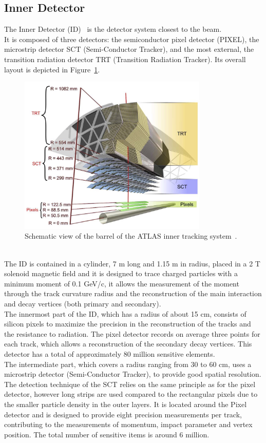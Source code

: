 \subsection{Inner Detector}
\label{sec:ID}
The Inner Detector (ID)~\cite{ATLAS} is the detector system closest to the beam.\\
It is composed of three detectors: the semiconductor pixel detector (PIXEL), the microstrip detector SCT (Semi-Conductor Tracker), and the most external, the transition radiation detector TRT (Transition Radiation 
Tracker).
Its overall layout is depicted in Figure~\ref{fig:ID}.
\begin{figure}[h]
	\centering
	\includegraphics[width=9cm]{Chapters/CH2/figures/ID}
	\caption{Schematic view of the barrel of the ATLAS inner tracking system~\cite{ATLAS}.}
	\label{fig:ID}
\end{figure}
\\The ID is contained in a cylinder, 7 m long and 1.15 m in radius, placed in a 2 T solenoid magnetic field and it is designed to trace charged particles with a minimum moment of 0.1 GeV/c, it allows the measurement of the moment through the track curvature radius and the reconstruction of the main interaction and decay vertices (both primary and secondary).\\
The innermost part of the ID, which has a radius of about 15 cm, consists of silicon pixels to maximize the precision in the reconstruction of the tracks and the resistance to radiation.
The pixel detector records on average three points for each track, which allows a reconstruction of the secondary decay vertices. This detector has a total of approximately 80 million sensitive elements.\\


\noindent The intermediate part, which covers a radius ranging from 30 to 60 cm, uses a microstrip detector (Semi-Conductor Tracker), to provide good spatial resolution.
The detection technique of the SCT relies on the same principle as for the pixel detector, however long strips are used compared to the rectangular pixels due to 
the smaller particle density in the outer layers.
It is located around the Pixel detector and is designed to provide eight precision measurements per track, contributing to the measurements of momentum, impact parameter and 
vertex position. The total number of sensitive items is around 6 million.\\



